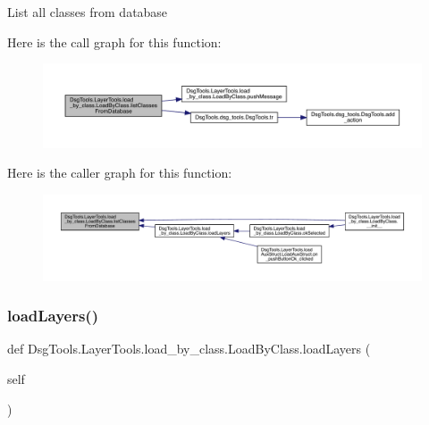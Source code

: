 \begin{DoxyVerb}List all classes from database
\end{DoxyVerb}
 Here is the call graph for this function\+:
\nopagebreak
\begin{figure}[H]
\begin{center}
\leavevmode
\includegraphics[width=350pt]{class_dsg_tools_1_1_layer_tools_1_1load__by__class_1_1_load_by_class_a1efa7341ff7e4a8cc6aa15d8e1ef9d9f_cgraph}
\end{center}
\end{figure}
Here is the caller graph for this function\+:
\nopagebreak
\begin{figure}[H]
\begin{center}
\leavevmode
\includegraphics[width=350pt]{class_dsg_tools_1_1_layer_tools_1_1load__by__class_1_1_load_by_class_a1efa7341ff7e4a8cc6aa15d8e1ef9d9f_icgraph}
\end{center}
\end{figure}
\mbox{\label{class_dsg_tools_1_1_layer_tools_1_1load__by__class_1_1_load_by_class_a1b632f61531a5ba993286a11b1b99345}} 
\subsubsection{\texorpdfstring{load\+Layers()}{loadLayers()}}
{\footnotesize\ttfamily def Dsg\+Tools.\+Layer\+Tools.\+load\+\_\+by\+\_\+class.\+Load\+By\+Class.\+load\+Layers (\begin{DoxyParamCaption}\item[{}]{self }\end{DoxyParamCaption})}

